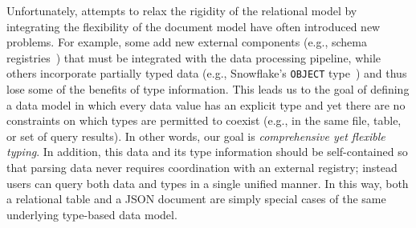 Unfortunately, attempts to relax the rigidity of the relational model by integrating the flexibility of the document model have often introduced new problems. For example, some add new external components (e.g., schema registries~\cite{confluent_schema_registry}) that must be integrated with the data processing pipeline, while others incorporate partially typed data (e.g., Snowflake's \texttt{OBJECT} type~\cite{snowflake}) and thus lose some of the benefits of type information.
This leads us to the goal of defining a data model in which every data value has an explicit type and yet there are no constraints on which types are permitted to coexist (e.g., in the same file, table, or set of query results). In other words, our goal is {\em comprehensive yet flexible typing}.
In addition, this data and its type information should be self-contained so that parsing data never requires coordination with an external registry; instead users can query both data and types in a single unified manner.  In this way, both a relational table and a JSON document are simply special cases of the same underlying type-based data model.

